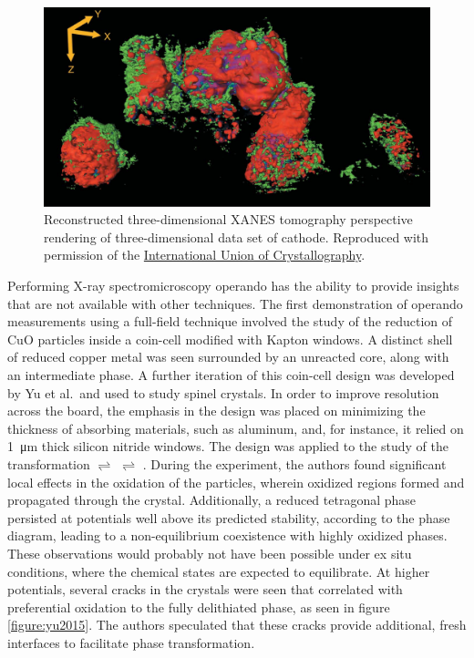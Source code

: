\documentclass[journal=cmatex,manuscript=perspective]{achemso}
\newcommand{\iucr}{Reproduced with permission of the
  \href{http://journals.iucr.org/}{International Union of
    Crystallography}.}
\begin{document}
\begin{figure}
  \includegraphics[width=\textwidth]{meirer2011.png}
  \caption{Reconstructed three-dimensional XANES tomography
    perspective rendering of three-dimensional data set of 
    cathode.\cite{meirer2011} \iucr}
  \label{figure:meirer2011}
\end{figure}

Performing X-ray spectromicroscopy operando has the ability to provide
insights that are not available with other techniques. The first
demonstration of operando measurements using a full-field technique
involved the study of the reduction of CuO particles inside a
coin-cell modified with Kapton windows\cite{wang2013}. A distinct
shell of reduced copper metal was seen surrounded by an unreacted
 core, along with an intermediate  phase. A further
iteration of this coin-cell design was developed by Yu et al.\ and
used to study  spinel crystals. In order to improve
resolution across the board, the emphasis in the design was placed on
minimizing the thickness of absorbing materials, such as aluminum,
and, for instance, it relied on \SI{1}{\micro\meter} thick silicon
nitride windows. The design was applied to the study of the
transformation  $\rightleftharpoons$ 
$\rightleftharpoons$ \cite{ohzuku1990}. During the
experiment, the authors found significant local effects in the
oxidation of the particles, wherein oxidized  regions
formed and propagated through the crystal. Additionally, a reduced
tetragonal  phase persisted at potentials well above its
predicted stability, according to the phase diagram, leading to a
non-equilibrium coexistence with highly oxidized phases. These
observations would probably not have been possible under ex situ
conditions, where the chemical states are expected to equilibrate. At
higher potentials, several cracks in the crystals were seen that
correlated with preferential oxidation to the fully delithiated
 phase, as seen in figure \ref{figure:yu2015}. The authors
speculated that these cracks provide additional, fresh interfaces to
facilitate phase transformation\cite{yu2015}.
\end{document}
